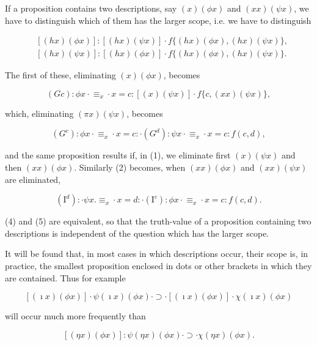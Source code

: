 \documentclass[10pt]{article}
\begin{document}
If a proposition contains two descriptions, say $(x)(\phi x)$ and $(x x)(\psi x)$, we have to distinguish which of them has the larger scope, i.e. we have to distinguish


\begin{align*}
& {[(h x)(\phi x)]:[(h x)(\psi x)] \cdot f\{(h x)(\phi x),(h x)(\psi x)\},}  \tag{1}\\
& {[(h x)(\psi x)]:[(h x)(\phi x)] \cdot f\{(h x)(\phi x),(h x)(\psi x)\} .} \tag{2}
\end{align*}


The first of these, eliminating $(x)(\phi x)$, becomes


\begin{equation*}
(G c): \phi x \cdot \equiv_{x} \cdot x=c:[(x)(\psi x)] \cdot f\{c,(x x)(\psi x)\}, \tag{3}
\end{equation*}


which, eliminating $(\pi x)(\psi x)$, becomes


\begin{equation*}
\left(G^{c}\right): \phi x \cdot \equiv_{x} \cdot x=c: \cdot\left(G^{d}\right): \psi x \cdot \equiv_{x} \cdot x=c: f(c, d), \tag{4}
\end{equation*}


and the same proposition results if, in (1), we eliminate first $(x)(\psi x)$ and then $(x x)(\phi x)$. Similarly (2) becomes, when $(x x)(\phi x)$ and $(x x)(\psi x)$ are eliminated,


\begin{equation*}
\left(\mathrm{I}^{d}\right): \cdot \psi x . \equiv_{x} \cdot x=d: \cdot\left(\mathrm{I}^{c}\right): \phi x \cdot \equiv_{x} \cdot x=c: f(c, d) . \tag{5}
\end{equation*}


(4) and (5) are equivalent, so that the truth-value of a proposition containing two descriptions is independent of the question which has the larger scope.

It will be found that, in most cases in which descriptions occur, their scope is, in practice, the smallest proposition enclosed in dots or other brackets in which they are contained. Thus for example

$$
[(\imath x)(\phi x)] \cdot \psi(\imath x)(\phi x) \cdot \supset \cdot[(\imath x)(\phi x)] \cdot \chi(\imath x)(\phi x)
$$

will occur much more frequently than

$$
[(\eta x)(\phi x)]: \psi(\eta x)(\phi x) \cdot \supset \cdot \chi(\eta x)(\phi x) .
$$
\end{document}
